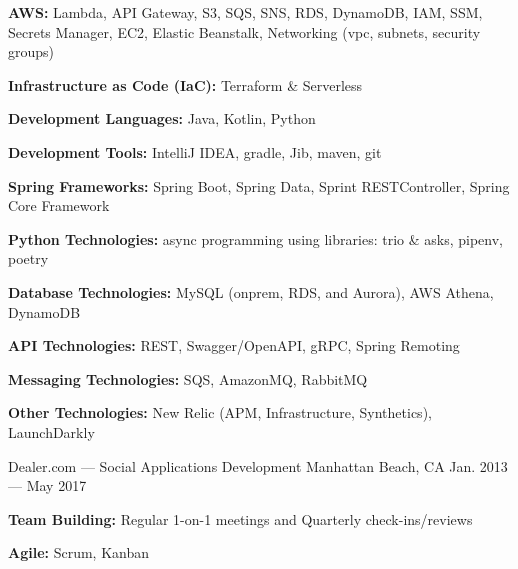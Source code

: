\vspace{-2.00mm}
\begin{cventries}

    {} %
    {} %
    {} %
    {%
      \begin{cvitems} %
        \item {\textbf{AWS:} Lambda, API Gateway, S3, SQS, SNS, RDS, DynamoDB, IAM, SSM, Secrets Manager, EC2, Elastic Beanstalk, Networking (vpc, subnets, security groups)}
        \item {\textbf{Infrastructure as Code (IaC):} Terraform \& Serverless}
        \item {\textbf{Development Languages:} Java, Kotlin, Python}
        \item {\textbf{Development Tools:} IntelliJ IDEA, gradle, Jib, maven, git}
        \item {\textbf{Spring Frameworks:} Spring Boot, Spring Data, Sprint RESTController, Spring Core Framework}
        \item {\textbf{Python Technologies:} async programming using libraries: trio \& asks, pipenv, poetry}
        \item {\textbf{Database Technologies:} MySQL (onprem, RDS, and Aurora), AWS Athena, DynamoDB}
        \item {\textbf{API Technologies:} REST, Swagger/OpenAPI, gRPC, Spring Remoting}
        \item {\textbf{Messaging Technologies:} SQS, AmazonMQ, RabbitMQ}
        \item {\textbf{Other Technologies:} New Relic (APM, Infrastructure, Synthetics), LaunchDarkly}
      \end{cvitems}
    }


    {Dealer.com --- Social Applications Development} %
    {Manhattan Beach, CA} %
    {Jan. 2013 --- May 2017} %
    {}
    \vspace{-6.00mm}

    {} %
    {} %
    {} %
    {\vspace{-0.5mm}
      \begin{cvitems} %
        \item {\textbf{Team Building:} Regular 1-on-1 meetings and Quarterly check-ins/reviews}
        \item {\textbf{Agile:} Scrum, Kanban}
      \end{cvitems}
    }


\end{cventries}
